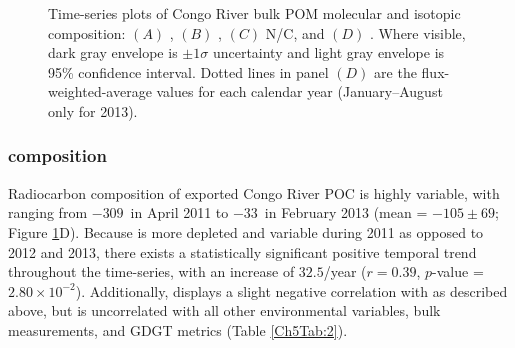 \begin{figure}[ht]
	\caption[Bulk parameter time-series plots]{Time-series plots of Congo River bulk POM molecular and isotopic composition: $(A)$ , $(B)$ , $(C)$ N/C, and $(D)$ . Where visible, dark gray envelope is $\pm 1 \sigma$ uncertainty and light gray envelope is 95\% confidence interval. Dotted lines in panel $(D)$ are the flux-weighted-average values for each calendar year (January--August only for 2013).}
	\label{Ch5Fig:3} 
\end{figure}

\subsubsection{ composition}

Radiocarbon composition of exported Congo River POC is highly variable, with  ranging from $-309$\textperthousand\ in April 2011 to $-33$\textperthousand\ in February 2013 (mean = $-105 \pm 69$\textperthousand; Figure \ref{Ch5Fig:3}D). Because  is more depleted and variable during 2011 as opposed to 2012 and 2013, there exists a statistically significant positive temporal trend throughout the time-series, with an increase of $32.5$\textperthousand/year ($r = 0.39$, $p$-value = $2.80 \times 10^{-2}$). Additionally,  displays a slight negative correlation with  as described above, but is uncorrelated with all other environmental variables, bulk measurements, and GDGT metrics (Table \ref{Ch5Tab:2}).

